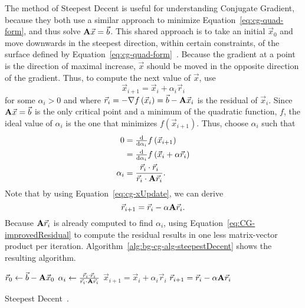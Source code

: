 The method of Steepest Decent is useful for understanding Conjugate Gradient, because they both use a similar approach to minimize Equation~\ref{eq:cg-quad-form}, and thus solve \(\mathbf{A}\vec{x}=\vec{b}\).
This shared approach is to take an initial \(\vec{x}_0\) and move downwards in the steepest direction, within certain constraints, of the surface defined by Equation~\ref{eq:cg-quad-form}~\cite{Nearing:2010:toolsForPhysics}.
Because the gradient at a point is the direction of maximal increase, \(\vec{x}\) should be moved in the opposite direction of the gradient.
Thus, to compute the next value of \(\vec{x}\), use
\begin{equation}
\label{eq:cg-xUpdate}
	\vec{x}_{i+1} = \vec{x}_i + \alpha_i \vec{r}_i
\end{equation}
for some \(\alpha_i > 0\) and where \(\vec{r}_i = -\nabla f\left(\vec{x}_i\right) = \vec{b} - \mathbf{A}\vec{x}_i\) is the residual of \(\vec{x}_i\).
Since \(\mathbf{A}\vec{x} = \vec{b}\) is the only critical point and a minimum of the quadratic function, \(f\), the ideal value of \(\alpha_i\) is the one that minimizes \(f\left(\vec{x}_{i+1}\right)\).
Thus, choose \(\alpha_i\) such that
\begin{align*}
	0
	&= \tfrac{\mathrm{d}}{\mathrm{d} \alpha_i} f\left(\vec{x}_{i+1}\right) \\
	&= \tfrac{\mathrm{d}}{\mathrm{d} \alpha_i} f\left(\vec{x}_i + \alpha \vec{r}_i\right) \\
%
	\alpha_i
	&= \frac{\vec{r}_i\cdot \vec{r}_i}{\vec{r}_i\cdot\mat{A}\vec{r}_i}.
\end{align*}
Note that by using Equation~\ref{eq:cg-xUpdate}, we can derive
\begin{equation}
\label{eq:CG-improvedResidual}
	\vec{r}_{i+1} = \vec{r}_i - \alpha\mathbf{A}\vec{r}_i.
\end{equation}
Because \(\mathbf{A}\vec{r}_i\) is already computed to find \(\alpha_i\), using Equation~\ref{eq:CG-improvedResidual} to compute the residual results in one less matrix-vector product per iteration.
Algorithm~\ref{alg:bg-cg-alg-steepestDecent} shows the resulting algorithm.
\begin{algorithm}[tb]
	\begin{algorithmic}
		\STATE \(\vec{r}_0 \gets \vec{b} - \mathbf{A}\vec{x}_0\)
			\STATE \(\alpha_i \gets \frac{\vec{r}_i\cdot \vec{r}_i}{\vec{r}_i\cdot\mathbf{A}\vec{r}_i}\)
			\STATE \(\vec{x}_{i+1} = \vec{x}_i + \alpha_i\vec{r}_i\)
			\STATE \(\vec{r}_{i+1} = \vec{r}_i - \alpha\mathbf{A}\vec{r}_i\)
		\ENDFOR
	\end{algorithmic}
	
	\caption{Steepest Decent~\cite{Shewchuk:1994:IntroToCG}.}
	\label{alg:bg-cg-alg-steepestDecent}
\end{algorithm}



